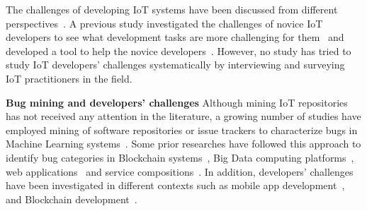 The challenges of developing IoT systems have been discussed from different perspectives~\cite{stojkoska2017review,vcolakovic2018IoT,hnat2011hitchhiker}. A previous study investigated the challenges of novice IoT developers to see what development tasks are more challenging for them~\cite{corno2019challenges} and developed a tool to help the novice developers~\cite{corno2019towards}. However, no study has tried to study IoT developers' challenges systematically by interviewing and surveying IoT practitioners in the field.


\textbf{Bug mining and developers' challenges}
Although mining IoT repositories has not received any attention in the literature, a growing number of studies have employed mining of software repositories or issue trackers to characterize bugs in Machine Learning systems~\cite{DlTaxFaults,zhangempiricalDL2020ICSE,islam2019comprehensive, TensorFBugsISSTA}. Some prior researches have followed this approach to identify bug categories in Blockchain systems~\cite{blockChainBugs}, Big Data computing platforms~\cite{bigDataIssues},  web applications~\cite{jsBugsOcariza} and service compositions~\cite{chan2007fault}. 
In addition, developers' challenges have been investigated in different contexts such as mobile app development~\cite{joorabchi2013real}, and Blockchain development~\cite{zou2019smart}. 


\endinput

